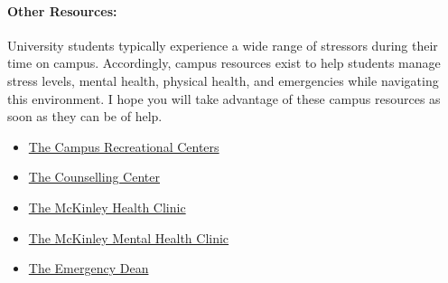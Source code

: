 \documentclass[11pt, a4paper]{article}
\begin{document}
\paragraph{Other Resources:}
University students typically experience a wide range of stressors during their
time on campus. Accordingly, campus resources exist to help students manage
stress levels, mental health, physical health, and emergencies while navigating
this environment. I hope you will take advantage of these campus resources as
soon as they can be of help.

\begin{itemize}
\item \href{https://campusrec.illinois.edu/}{The Campus Recreational Centers}
\item \href{http://counselingcenter.illinois.edu/}{The Counselling Center}
\item \href{https://mckinley.illinois.edu/}{The McKinley Health Clinic}
\item \href{http://www.mckinley.illinois.edu/medical-services/mental-health}{The McKinley Mental Health Clinic}
\item \href{https://odos.illinois.edu/community-of-care/emergency-dean/}{The Emergency Dean}
\end{itemize}
\end{document}

